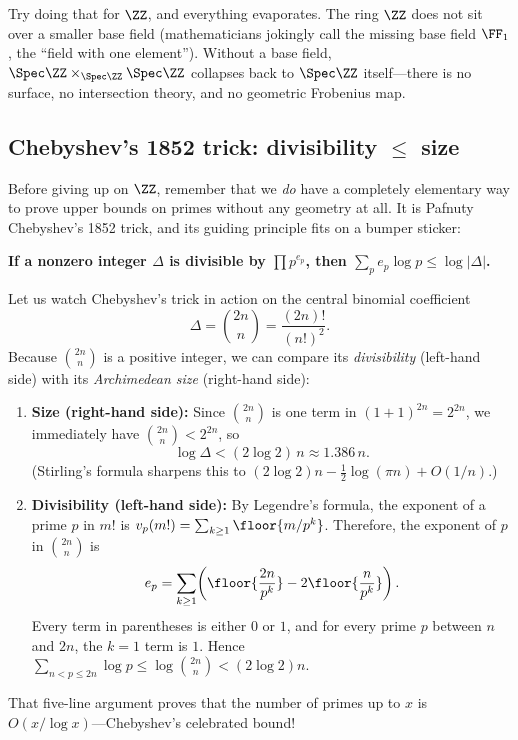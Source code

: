 Try doing that for \(\ZZ\), and everything evaporates. The ring \(\ZZ\) does not sit over a smaller base field (mathematicians jokingly call the missing base field \(\FF_1\), the ``field with one element''). Without a base field, \(\Spec \ZZ \times_{\Spec \ZZ} \Spec \ZZ\) collapses back to \(\Spec \ZZ\) itself---there is no surface, no intersection theory, and no geometric Frobenius map.

\subsection{Chebyshev's 1852 trick: divisibility \(\le\) size}

Before giving up on \(\ZZ\), remember that we \emph{do} have a completely elementary way to prove upper bounds on primes without any geometry at all. It is Pafnuty Chebyshev's 1852 trick, and its guiding principle fits on a bumper sticker:
\begin{center}
  \textbf{If a nonzero integer \(\Delta\) is divisible by \(\prod p^{e_p}\), then \(\sum_p e_p \log p \le \log |\Delta|\).}
\end{center}
Let us watch Chebyshev's trick in action on the central binomial coefficient
\[
  \Delta = \binom{2n}{n} = \frac{(2n)!}{(n!)^2}.
\]
Because \(\binom{2n}{n}\) is a positive integer, we can compare its \emph{divisibility} (left-hand side) with its \emph{Archimedean size} (right-hand side):
\begin{enumerate}
  \item \textbf{Size (right-hand side):} Since \(\binom{2n}{n}\) is one term in \((1+1)^{2n} = 2^{2n}\), we immediately have \(\binom{2n}{n} < 2^{2n}\), so
  \[
    \log \Delta < (2\log 2)\,n \approx 1.386\,n.
  \]
  (Stirling's formula sharpens this to \((2\log 2)n - \tfrac{1}{2}\log(\pi n) + O(1/n)\).)
  \item \textbf{Divisibility (left-hand side):} By Legendre's formula, the exponent of a prime \(p\) in \(m!\) is \(v_p(m!) = \sum_{k\ge 1} \floor{m/p^k}\). Therefore, the exponent of \(p\) in \(\binom{2n}{n}\) is
  \[
    e_p = \sum_{k \ge 1} \!\left(\floor{\frac{2n}{p^k}} - 2\floor{\frac{n}{p^k}}\right).
  \]
  Every term in parentheses is either \(0\) or \(1\), and for every prime \(p\) between \(n\) and \(2n\), the \(k=1\) term is \(1\). Hence \(\sum_{n < p \le 2n} \log p \le \log \binom{2n}{n} < (2\log 2)n\).
\end{enumerate}

That five-line argument proves that the number of primes up to \(x\) is \(O(x/\log x)\)---Chebyshev's celebrated bound!

